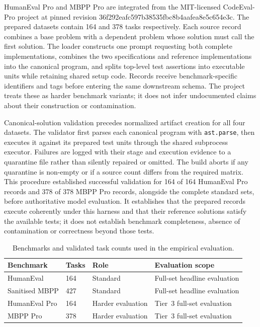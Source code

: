 HumanEval Pro and MBPP Pro are integrated from the MIT-licensed CodeEval-Pro project at pinned revision 36f292eafc597b38535fbc8b4aafea8e5c654e3c. The prepared datasets contain 164 and 378 tasks respectively. Each source record combines a base problem with a dependent problem whose solution must call the first solution. The loader constructs one prompt requesting both complete implementations, combines the two specifications and reference implementations into the canonical program, and splits top-level test assertions into executable units while retaining shared setup code. Records receive benchmark-specific identifiers and tags before entering the same downstream schema. The project treats these as harder benchmark variants; it does not infer undocumented claims about their construction or contamination.

Canonical-solution validation precedes normalized artifact creation for all four datasets. The validator first parses each canonical program with \texttt{ast.parse}, then executes it against its prepared test units through the shared subprocess executor. Failures are logged with their stage and execution evidence to a quarantine file rather than silently repaired or omitted. The build aborts if any quarantine is non-empty or if a source count differs from the required matrix. This procedure established successful validation for 164 of 164 HumanEval Pro records and 378 of 378 MBPP Pro records, alongside the complete standard sets, before authoritative model evaluation. It establishes that the prepared records execute coherently under this harness and that their reference solutions satisfy the available tests; it does not establish benchmark completeness, absence of contamination or correctness beyond those tests.

\begin{table}[htbp]
    \centering
    \caption{Benchmarks and validated task counts used in the empirical evaluation.}
    \label{tab:benchmark-summary}
    \small
    \renewcommand{\arraystretch}{1.15}
    \setlength{\tabcolsep}{4pt}
    \begin{tabular}{p{} p{} p{} p{}}
        \hline
        Benchmark & Tasks & Role & Evaluation scope \\
        \hline
        HumanEval & 164 & Standard & Full-set headline evaluation \\
        Sanitised MBPP & 427 & Standard & Full-set headline evaluation \\
        HumanEval Pro & 164 & Harder evaluation & Tier~3 full-set evaluation \\
        MBPP Pro & 378 & Harder evaluation & Tier~3 full-set evaluation \\
        \hline
    \end{tabular}
\end{table}

